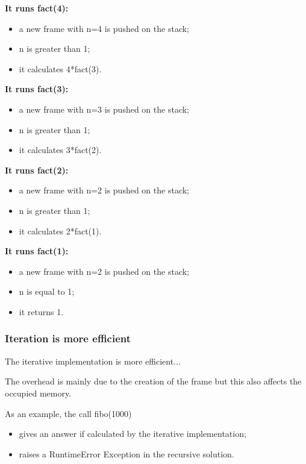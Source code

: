 \textbf{It runs fact(4):}
\begin{itemize}
	\item a new frame with n=4 is pushed on the stack;
	\item n is greater than 1;
	\item it calculates 4*fact(3).
\end{itemize}
\textbf{It runs fact(3):}
\begin{itemize}
	\item a new frame with n=3 is pushed on the stack;
	\item n is greater than 1;
	\item it calculates 3*fact(2).
\end{itemize}
\textbf{It runs fact(2):}
\begin{itemize}
	\item a new frame with n=2 is pushed on the stack;
	\item n is greater than 1;
	\item it calculates 2*fact(1).
\end{itemize}
\textbf{It runs fact(1):}
\begin{itemize}
	\item a new frame with n=2 is pushed on the stack;
	\item n is equal to 1;
	\item it returns 1.
\end{itemize}

\subsubsection{Iteration is more efficient}
The iterative implementation is more efficient...

The overhead is mainly due to the creation of the frame but this also affects the occupied memory.

As an example, the call fibo(1000)
\begin{itemize}
	\item gives an answer if calculated by the iterative implementation;
	\item raises a RuntimeError Exception in the recursive solution.
\end{itemize}